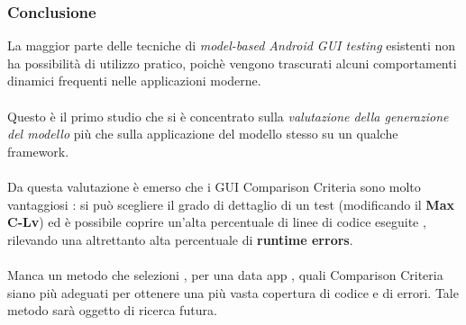 \documentclass[12pt]{beamer}
\begin{document}
\begin{frame}
\frametitle{Conclusione}
La maggior parte delle tecniche di \textit{model-based Android GUI testing} esistenti non ha possibilit\`a di utilizzo pratico, poich\`e vengono trascurati alcuni comportamenti dinamici frequenti nelle applicazioni moderne.
\\~\\
Questo \`e il primo studio che si \`e concentrato sulla \textit{valutazione della generazione del modello} pi\`u che sulla applicazione del modello stesso su un qualche framework.
\\~\\
Da questa valutazione \`e emerso che i GUI Comparison Criteria sono molto vantaggiosi : si pu\`o scegliere il grado di dettaglio di un test (modificando il \textbf{Max C-Lv}) ed \`e possibile coprire un'alta percentuale di linee di codice eseguite , rilevando una altrettanto alta percentuale di \textbf{runtime errors}.
\\~\\
Manca un metodo che selezioni , per una data app , quali Comparison Criteria siano pi\`u adeguati per ottenere una pi\`u vasta copertura di codice e di errori. Tale metodo sar\`a oggetto di ricerca futura.


\end{frame}

\end{document}
